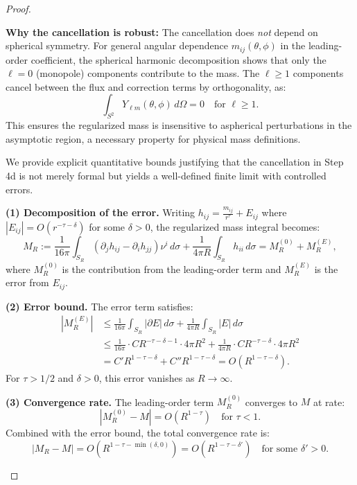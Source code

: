 \begin{proof}
\begin{remark}
\textbf{Why the cancellation is robust:} The cancellation does \emph{not} depend on spherical symmetry. For general angular dependence $m_{ij}(\theta,\phi)$ in the leading-order coefficient, the spherical harmonic decomposition shows that only the $\ell = 0$ (monopole) components contribute to the mass. The $\ell \ge 1$ components cancel between the flux and correction terms by orthogonality, as:
\begin{equation}
    \int_{S^2} Y_{\ell m}(\theta,\phi) \, d\Omega = 0 \quad \text{for } \ell \ge 1.
\end{equation}
This ensures the regularized mass is insensitive to aspherical perturbations in the asymptotic region, a necessary property for physical mass definitions.
\end{remark}

\begin{remark}\label{rem:Step4dErrorBounds}
We provide explicit quantitative bounds justifying that the cancellation in Step 4d is not merely formal but yields a well-defined finite limit with controlled errors.

\textbf{(1) Decomposition of the error.} Writing $h_{ij} = \frac{m_{ij}}{r^\tau} + E_{ij}$ where $|E_{ij}| = O(r^{-\tau-\delta})$ for some $\delta > 0$, the regularized mass integral becomes:
\begin{equation}
    M_R := \frac{1}{16\pi} \int_{S_R} (\partial_j h_{ij} - \partial_i h_{jj}) \nu^i \, d\sigma + \frac{1}{4\pi R} \int_{S_R} h_{ii} \, d\sigma = M_R^{(0)} + M_R^{(E)},
\end{equation}
where $M_R^{(0)}$ is the contribution from the leading-order term and $M_R^{(E)}$ is the error from $E_{ij}$.

\textbf{(2) Error bound.} The error term satisfies:
\begin{align}
    |M_R^{(E)}| &\le \frac{1}{16\pi} \int_{S_R} |\partial E| \, d\sigma + \frac{1}{4\pi R} \int_{S_R} |E| \, d\sigma \\
    &\le \frac{1}{16\pi} \cdot C R^{-\tau-\delta-1} \cdot 4\pi R^2 + \frac{1}{4\pi R} \cdot C R^{-\tau-\delta} \cdot 4\pi R^2 \\
    &= C' R^{1-\tau-\delta} + C'' R^{1-\tau-\delta} = O(R^{1-\tau-\delta}).
\end{align}
For $\tau > 1/2$ and $\delta > 0$, this error vanishes as $R \to \infty$.

\textbf{(3) Convergence rate.} The leading-order term $M_R^{(0)}$ converges to $M$ at rate:
\begin{equation}
    |M_R^{(0)} - M| = O(R^{1-\tau}) \quad \text{for } \tau < 1.
\end{equation}
Combined with the error bound, the total convergence rate is:
\begin{equation}
    |M_R - M| = O(R^{1-\tau-\min(\delta,0)}) = O(R^{1-\tau-\delta'}) \quad \text{for some } \delta' > 0.
\end{equation}


\end{remark}
\end{proof}
